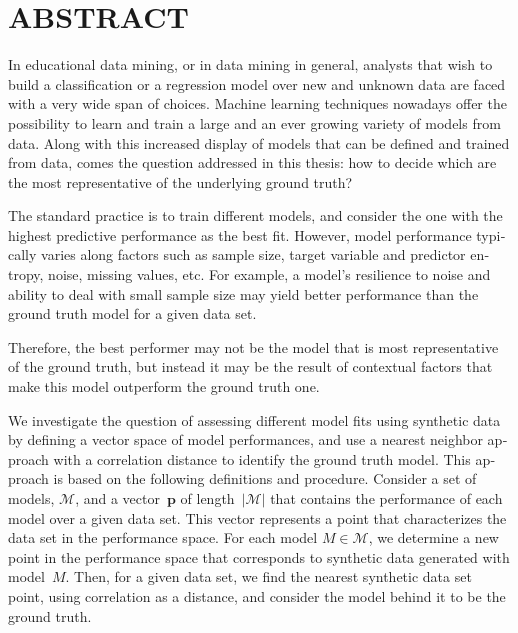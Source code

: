 %

\chapter*{ABSTRACT}\thispagestyle{headings}
%
\begin{otherlanguage}{english}

In educational data mining, or in data mining in general, analysts that wish to build a classification or a regression model over new and unknown data are faced with a very wide span of choices. Machine learning techniques nowadays offer the possibility to learn and train a large and an ever growing variety of models from data. Along with this increased display of models that can be defined and trained from data, comes the question addressed in this thesis: how to decide which are the most representative of the underlying ground truth?

The standard practice is to train different models, and consider the one with the highest predictive performance as the best fit. However, model performance typically varies along factors such as sample size, target variable and predictor entropy, noise, missing values, etc. For example, a model's resilience to noise and ability to deal with small sample size may yield better performance than the ground truth model for a given data set. 

Therefore, the best performer may not be the model that is most representative of the ground truth, but instead it may be the result of contextual factors that make this model outperform the ground truth one.  

We investigate the question of assessing different model fits using synthetic data by defining a vector space of model performances, and use a nearest neighbor approach with a correlation distance to identify the ground truth model. This approach is based on the following definitions and procedure. Consider a set of models, $\mathcal{M}$, and a vector~$\mathbf{p}$ of length~$|\mathcal{M}|$ that contains the performance of each model over a given data set. This vector represents a point that characterizes the data set in the performance space. For each model $M \in \mathcal{M}$, we determine a new point in the performance space that corresponds to synthetic data generated with model~$M$. Then, for a given data set, we find the nearest synthetic data set point, using correlation as a distance, and consider the model behind it to be the ground truth.


\end{otherlanguage}
